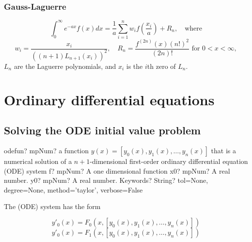 \subsection{Gauss-Laguerre}
\begin{equation}
\int_0^\infty e^{-ax} f(x) dx = \frac{1}{a} \sum_{i=1}^n w_i f\left(\frac{x_i}{a}\right) + R_n, \quad \text{where}
\end{equation}
\begin{equation}
w_i = \frac{x_i}{((n+1)L_{n+1} (x_i))^2}, \quad R_n=\frac{f^{(2n)}(x) (n!)^2}{(2n)!} \text{ for } 0<x<\infty,
\end{equation}
$L_n$ are the Laguerre polynomials, and $x_i$ is the $i$th zero of $L_n$.






\newpage
\chapter{Ordinary differential equations}

\section{Solving the ODE initial value problem}


\begin{mpFunctionsExtract}
	\mpFunctionFour
	{odefun? mpNum? a function $y(x) = [y_0(x),y_1(x),\ldots,y_n(x)]$ that is a numerical solution of a $n+1$-dimensional first-order ordinary differential equation (ODE) system}
	{f? mpNum? A one dimensional function}
	{x0? mpNum? A real number.}	
	{y0? mpNum? A real number.}		
	{Keywords? String?  tol=None, degree=None, method='taylor', verbose=False}	
\end{mpFunctionsExtract}



The (ODE) system has the form

\begin{equation}
y'_0(x) = F_0(x,[y_0(x),y_1(x),\ldots,y_n(x)])
\end{equation}
\begin{equation}
y'_0(x) = F_1(x,[y_0(x),y_1(x),\ldots,y_n(x)])
\end{equation}

